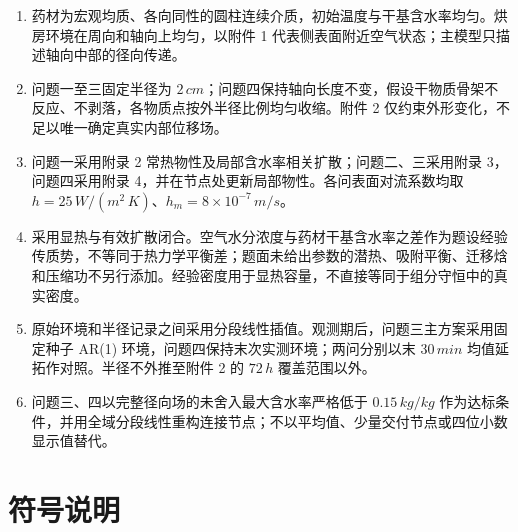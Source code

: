 \documentclass[withoutpreface,bwprint]{cumcmthesis}
\begin{document}
\begin{enumerate}
  \item 药材为宏观均质、各向同性的圆柱连续介质，初始温度与干基含水率均匀。烘房环境在周向和轴向上均匀，以附件 1 代表侧表面附近空气状态；主模型只描述轴向中部的径向传递。
  \item 问题一至三固定半径为 $2\,\si{cm}$；问题四保持轴向长度不变，假设干物质骨架不反应、不剥落，各物质点按外半径比例均匀收缩。附件 2 仅约束外形变化，不足以唯一确定真实内部位移场。
  \item 问题一采用附录 2 常热物性及局部含水率相关扩散；问题二、三采用附录 3，问题四采用附录 4，并在节点处更新局部物性。各问表面对流系数均取 $h=25\,\si{W/(m^2\,K)}$、$h_m=8\times10^{-7}\,\si{m/s}$。
  \item 采用显热与有效扩散闭合。空气水分浓度与药材干基含水率之差作为题设经验传质势，不等同于热力学平衡差；题面未给出参数的潜热、吸附平衡、迁移焓和压缩功不另行添加。经验密度用于显热容量，不直接等同于组分守恒中的真实密度。
  \item 原始环境和半径记录之间采用分段线性插值。观测期后，问题三主方案采用固定种子 AR(1) 环境，问题四保持末次实测环境；两问分别以末 $30\,\si{min}$ 均值延拓作对照。半径不外推至附件 2 的 $72\,\si{h}$ 覆盖范围以外。
  \item 问题三、四以完整径向场的未舍入最大含水率严格低于 $0.15\,\si{kg/kg}$ 作为达标条件，并用全域分段线性重构连接节点；不以平均值、少量交付节点或四位小数显示值替代。
\end{enumerate}

\section{符号说明}
\end{document}
